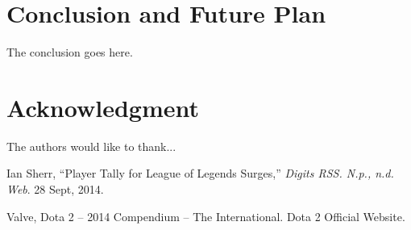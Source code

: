 \documentclass[conference]{IEEEtran}
\begin{document}
\section{Conclusion and Future Plan}
The conclusion goes here.






\section*{Acknowledgment}


The authors would like to thank...







%
%
%


\begin{thebibliography}{10}

Ian Sherr, ``Player Tally for League of Legends Surges,'' \textit{Digits RSS. N.p., n.d. Web}. 28 Sept, 2014.

Valve, Dota 2 -- 2014 Compendium -- The International. Dota 2 Official Website.

\end{thebibliography}




\end{document}
